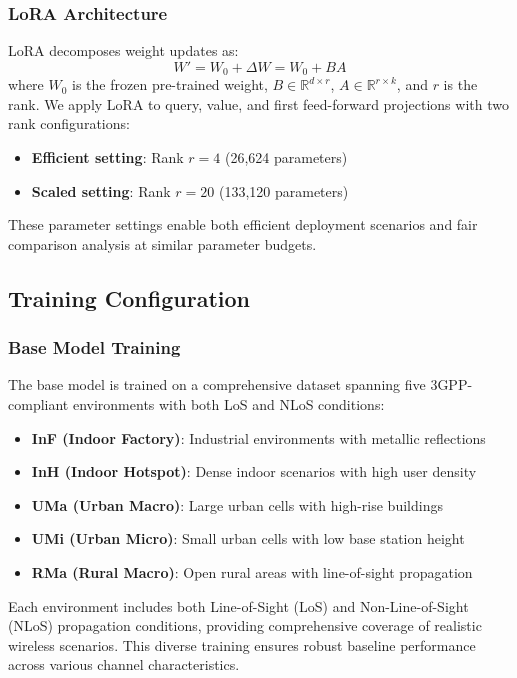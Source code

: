 \documentclass[conference]{IEEEtran}
\begin{document}
\subsubsection{LoRA Architecture}
LoRA decomposes weight updates as:
\begin{equation}
W' = W_0 + \Delta W = W_0 + BA
\end{equation}
where $W_0$ is the frozen pre-trained weight, $B \in \mathbb{R}^{d \times r}$, $A \in \mathbb{R}^{r \times k}$, and $r$ is the rank. We apply LoRA to query, value, and first feed-forward projections with two rank configurations:
\begin{itemize}
\item \textbf{Efficient setting}: Rank $r=4$ (26,624 parameters)
\item \textbf{Scaled setting}: Rank $r=20$ (133,120 parameters)
\end{itemize}

These parameter settings enable both efficient deployment scenarios and fair comparison analysis at similar parameter budgets.

\subsection{Training Configuration}

\subsubsection{Base Model Training}
The base model is trained on a comprehensive dataset spanning five 3GPP-compliant environments with both LoS and NLoS conditions:
\begin{itemize}
\item \textbf{InF (Indoor Factory)}: Industrial environments with metallic reflections
\item \textbf{InH (Indoor Hotspot)}: Dense indoor scenarios with high user density  
\item \textbf{UMa (Urban Macro)}: Large urban cells with high-rise buildings
\item \textbf{UMi (Urban Micro)}: Small urban cells with low base station height
\item \textbf{RMa (Rural Macro)}: Open rural areas with line-of-sight propagation
\end{itemize}

Each environment includes both Line-of-Sight (LoS) and Non-Line-of-Sight (NLoS) propagation conditions, providing comprehensive coverage of realistic wireless scenarios. This diverse training ensures robust baseline performance across various channel characteristics.
\end{document}
